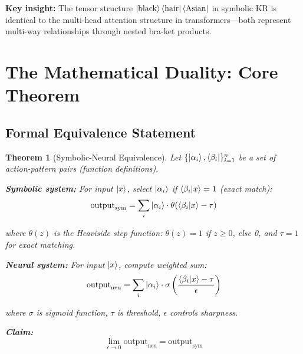 \documentclass[11pt,a4paper]{article}
\newtheorem{theorem}{Theorem}[section]
\theoremstyle{definition}
\begin{document}
\textbf{Key insight:} The tensor structure $\ket{\text{black}}\bra{\text{hair}}\bra{\text{Asian}}$ in symbolic KR is identical to the multi-head attention structure in transformers---both represent multi-way relationships through nested bra-ket products.

\section{The Mathematical Duality: Core Theorem}

\subsection{Formal Equivalence Statement}

\begin{theorem}[Symbolic-Neural Equivalence]
\label{thm:equivalence}
Let $\{\ket{\alpha_i}, \bra{\beta_i}\}_{i=1}^n$ be a set of action-pattern pairs (function definitions).

\textbf{Symbolic system:} For input $\ket{x}$, select $\ket{\alpha_i}$ if $\braket{\beta_i|x} = 1$ (exact match):
\begin{equation}
\text{output}_{\text{sym}} = \sum_i \ket{\alpha_i} \cdot \theta(\braket{\beta_i|x} - \tau)
\end{equation}

where $\theta(z)$ is the Heaviside step function: $\theta(z) = 1$ if $z \geq 0$, else 0, and $\tau = 1$ for exact matching.

\textbf{Neural system:} For input $\ket{x}$, compute weighted sum:
\begin{equation}
\text{output}_{\text{neu}} = \sum_i \ket{\alpha_i} \cdot \sigma\left(\frac{\braket{\beta_i|x} - \tau}{\epsilon}\right)
\end{equation}

where $\sigma$ is sigmoid function, $\tau$ is threshold, $\epsilon$ controls sharpness.

\textbf{Claim:}
\begin{equation}
\lim_{\epsilon \to 0} \text{output}_{\text{neu}} = \text{output}_{\text{sym}}
\end{equation}
\end{theorem}
\end{document}
